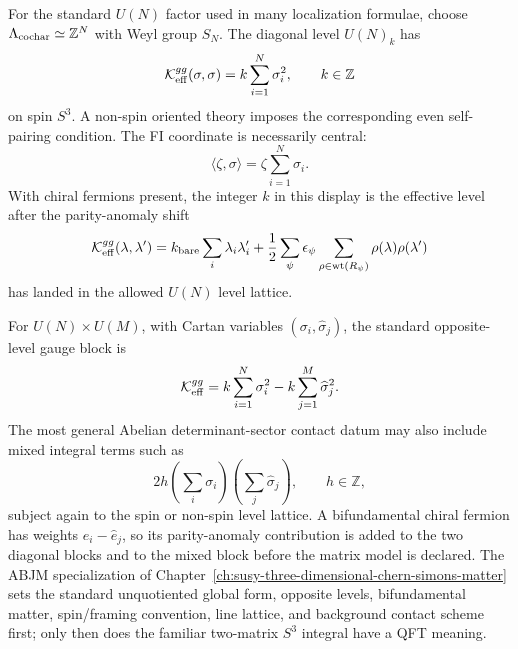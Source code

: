 \begin{example}
\label{ex:s3-un-standard-level-data}
For the standard \(U(N)\) factor used in many localization formulae, choose
\(\Lambda_{\rm cochar}\simeq\mathbb Z^N\) with Weyl group \(S_N\).  The diagonal
level \(U(N)_k\) has
\[
  \mathcal K_{\rm eff}^{gg}(\sigma,\sigma)
  =
  k\sum_{i=1}^N\sigma_i^2,
  \qquad k\in\mathbb Z
\]
on spin \(S^3\).  A non-spin oriented theory imposes the corresponding even
self-pairing condition.  The FI coordinate is necessarily central:
\[
  \langle\zeta,\sigma\rangle
  =
  \zeta\sum_{i=1}^N\sigma_i .
\]
With chiral fermions present, the integer \(k\) in this display is the
effective level after the parity-anomaly shift
\[
  \mathcal K_{\rm eff}^{gg}(\lambda,\lambda')
  =
  k_{\rm bare}\sum_i\lambda_i\lambda_i'
  +
  \frac12
  \sum_\psi\epsilon_\psi
  \sum_{\rho\in{\rm wt}(R_\psi)}
  \rho(\lambda)\rho(\lambda')
\]
has landed in the allowed \(U(N)\) level lattice.
\end{example}

\begin{example}
\label{ex:s3-product-group-mixed-levels}
For \(U(N)\times U(M)\), with Cartan variables
\((\sigma_i,\widehat\sigma_j)\), the standard opposite-level gauge block is
\[
  \mathcal K_{\rm eff}^{gg}
  =
  k\sum_{i=1}^N\sigma_i^2
  -
  k\sum_{j=1}^M\widehat\sigma_j^2 .
\]
The most general Abelian determinant-sector contact datum may also include
mixed integral terms such as
\[
  2h
  \left(\sum_i\sigma_i\right)
  \left(\sum_j\widehat\sigma_j\right),
  \qquad h\in\mathbb Z,
\]
subject again to the spin or non-spin level lattice.  A bifundamental chiral
fermion has weights \(e_i-\widehat e_j\), so its parity-anomaly contribution is
added to the two diagonal blocks and to the mixed block before the matrix model
is declared.  The ABJM specialization of
Chapter~\ref{ch:susy-three-dimensional-chern-simons-matter} sets the standard
unquotiented global form, opposite levels, bifundamental matter,
spin/framing convention, line lattice, and background contact scheme first; only
then does the familiar two-matrix \(S^3\) integral have a QFT meaning.
\end{example}

